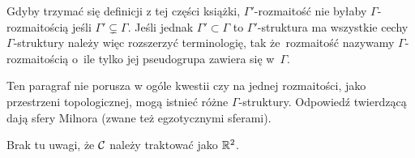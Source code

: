 \documentclass[a4paper,11pt]{article}
\begin{document}
\vspace{\spaceFour}


\start {} Gdyby trzymać się definicji z tej części książki,
$\Gamma'$-rozmaitość nie byłaby $\Gamma$-rozmaitością
jeśli $\Gamma' \subsetneq \Gamma$. Jeśli jednak
$\Gamma' \subset \Gamma$ to $\Gamma'$-struktura ma wszystkie
cechy $\Gamma$-struktury należy więc rozszerzyć terminologię,
tak że~rozmaitość nazywamy $\Gamma$-rozmaitością o~ile tylko jej
pseudogrupa zawiera się w~$\Gamma$.

\vspace{\spaceFour}



\start {} Ten paragraf nie porusza w ogóle kwestii czy na jednej
rozmaitości, jako przestrzeni topologicznej, mogą istnieć różne
$\Gamma$-struktury. Odpowiedź twierdzącą dają sfery Milnora
(zwane też egzotycznymi sferami).

\vspace{\spaceFour}



\start {} Brak tu uwagi, że $\mathcal{C}$ należy traktować jako
$\mathbb{R}^{ 2 }$.

\vspace{\spaceFour}






\end{document}
